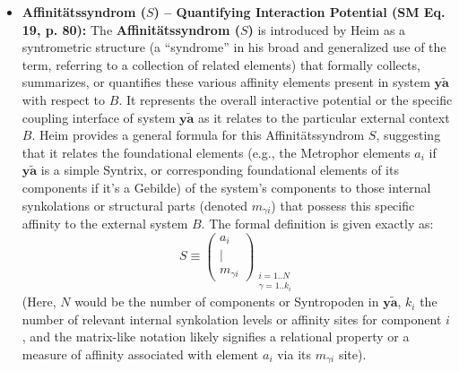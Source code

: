 \documentclass[12pt]{article}
\newcommand{\q}[1]{\enquote{#1}}
\newcommand{\affinitaetssyndrom}{S}
\begin{document}
\begin{itemize}
    \item \textbf{Affinitätssyndrom (\( \affinitaetssyndrom \)) – Quantifying Interaction Potential (SM Eq. 19, p. 80):}
    The \textbf{Affinitätssyndrom (\( \affinitaetssyndrom \))} is introduced by Heim as a syntrometric structure (a \q{syndrome} in his broad and generalized use of the term, referring to a collection of related elements) that formally collects, summarizes, or quantifies these various affinity elements present in system \( \mathbf{y\widetilde{a}} \) with respect to \( B \). It represents the overall interactive potential or the specific coupling interface of system \( \mathbf{y\widetilde{a}} \) as it relates to the particular external context \( B \). Heim provides a general formula for this Affinitätssyndrom \( \affinitaetssyndrom \), suggesting that it relates the foundational elements (e.g., the Metrophor elements \( a_i \) if \( \mathbf{y\widetilde{a}} \) is a simple Syntrix, or corresponding foundational elements of its components if it's a Gebilde) of the system's components to those internal synkolations or structural parts (denoted \( m_{\gamma i} \)) that possess this specific affinity to the external system \( B \). The formal definition is given exactly as:
    \begin{equation}
    S \equiv \begin{pmatrix} a_i \\ | \\ m_{\gamma i} \end{pmatrix}_{\substack{i=1..N \\ \gamma=1..k_i}}
    \label{eq:original_affinitaetssyndrom_general}
    \end{equation}
    (Here, \( N \) would be the number of components or Syntropoden in \( \mathbf{y\widetilde{a}} \), \( k_i \) the number of relevant internal synkolation levels or affinity sites for component \(i\), and the matrix-like notation likely signifies a relational property or a measure of affinity associated with element \(a_i\) via its \(m_{\gamma i}\) site).


\end{itemize}
\end{document}
